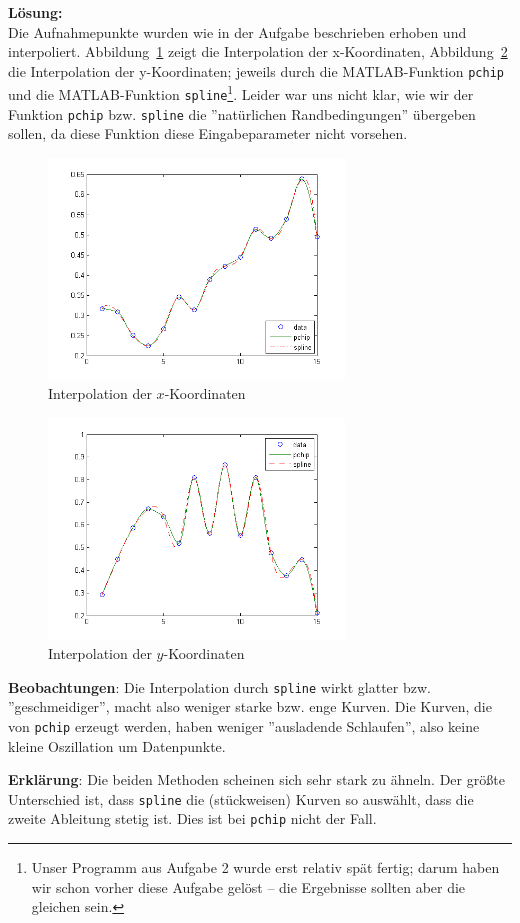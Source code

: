 \documentclass[11pt,a4paper,ngerman]{article}
\begin{document}
\textbf{Lösung:}\\

Die Aufnahmepunkte wurden wie in der Aufgabe beschrieben erhoben und interpoliert. Abbildung~\ref{abb:1} zeigt die Interpolation der x-Koordinaten, Abbildung~\ref{abb:2} die Interpolation der y-Koordinaten; jeweils durch  die MATLAB-Funktion \texttt{pchip} und die MATLAB-Funktion \texttt{spline}\footnote{Unser Programm aus Aufgabe 2 wurde erst relativ spät fertig; darum haben wir schon vorher diese Aufgabe gelöst -- die Ergebnisse sollten aber die gleichen sein.}.
Leider war uns nicht klar, wie wir der Funktion \texttt{pchip} bzw. \texttt{spline} die ''natürlichen Randbedingungen'' übergeben sollen, da diese Funktion diese Eingabeparameter nicht vorsehen.

\begin{figure}[h!]
\centering
\includegraphics[width=0.7\textwidth]{plotX.png}
\caption{Interpolation der $x$-Koordinaten\label{abb:1}}
\end{figure}

\begin{figure}[h!]
\centering
\includegraphics[width=0.7\textwidth]{plotY.png}
\caption{Interpolation der $y$-Koordinaten\label{abb:2}}
\end{figure}

\textbf{Beobachtungen}: Die Interpolation durch \texttt{spline} wirkt glatter bzw. ''geschmeidiger'',
macht also weniger starke bzw. enge Kurven. Die Kurven, die von \texttt{pchip} erzeugt werden, haben
weniger ''ausladende Schlaufen'', also keine kleine Oszillation um Datenpunkte.

\textbf{Erklärung}: Die beiden Methoden scheinen sich sehr stark zu ähneln. Der größte Unterschied ist,
dass \texttt{spline} die (stückweisen) Kurven so auswählt, dass die zweite Ableitung stetig ist.
Dies ist bei \texttt{pchip} nicht der Fall.
\label{LastPage}
\end{document}
